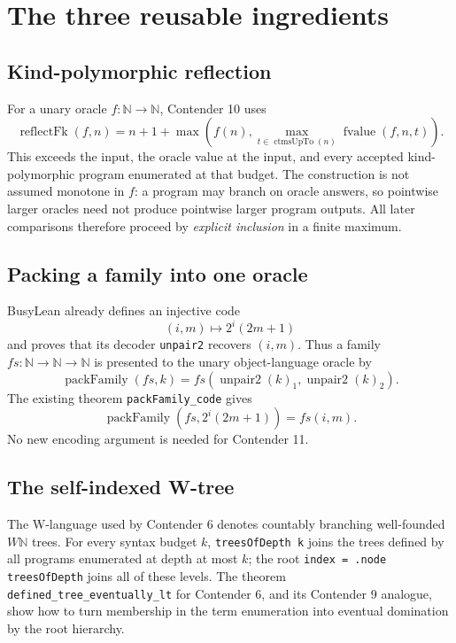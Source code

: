 \documentclass[11pt]{article}
\theoremstyle{definition}
\theoremstyle{remark}
\newcommand{\N}{\mathbb{N}}
\newcommand{\lean}[1]{\texttt{#1}}
\begin{document}
\section{The three reusable ingredients}

\subsection{Kind-polymorphic reflection}

For a unary oracle $f:\N\to\N$, Contender 10 uses
\[
  \operatorname{reflectFk}(f,n)
  = n+1+\max\!\left(f(n),
      \max_{t\in\operatorname{ctmsUpTo}(n)}
        \operatorname{fvalue}(f,n,t)\right).
\]
This exceeds the input, the oracle value at the input, and every accepted
kind-polymorphic program enumerated at that budget.  The construction is not
assumed monotone in $f$: a program may branch on oracle answers, so pointwise
larger oracles need not produce pointwise larger program outputs.  All later
comparisons therefore proceed by \emph{explicit inclusion} in a finite maximum.

\subsection{Packing a family into one oracle}

BusyLean already defines an injective code
\[
   (i,m)\longmapsto 2^i(2m+1)
\]
and proves that its decoder \lean{unpair2} recovers $(i,m)$.  Thus a family
$fs:\N\to\N\to\N$ is presented to the unary object-language oracle by
\[
  \operatorname{packFamily}(fs,k)
    =fs(\operatorname{unpair2}(k)_1,
        \operatorname{unpair2}(k)_2).
\]
The existing theorem \lean{packFamily\_code} gives
\[
  \operatorname{packFamily}(fs,2^i(2m+1))=fs(i,m).
\]
No new encoding argument is needed for Contender 11.

\subsection{The self-indexed W-tree}

The W-language used by Contender 6 denotes countably branching well-founded
$W\N$ trees.  For every syntax budget $k$, \lean{treesOfDepth k} joins the trees
defined by all programs enumerated at depth at most $k$; the root
\lean{index = .node treesOfDepth} joins all of these levels.  The theorem
\lean{defined\_tree\_eventually\_lt} for Contender 6, and its Contender 9 analogue,
show how to turn membership in the term enumeration into eventual domination
by the root hierarchy.
\end{document}
